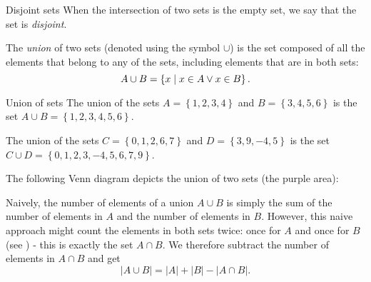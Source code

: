 \begin{note}{Disjoint sets}{}
	When the intersection of two sets is the empty set, we say that the set is \emph{disjoint}.
\end{note}

The \emph{union} of two sets (denoted using the symbol $\cup$) is the set composed of all the elements that belong to any of the sets, including elements that are in both sets:
\begin{equation}
	A\cup B = \left\{ x \mid x\in A \vee x\in B \right\}.
	\label{eq:union}
\end{equation}

\begin{example}{Union of sets}{}
	The union of the sets $A=\left\{ 1,2,3,4 \right\}$ and $B=\left\{ 3,4,5,6 \right\}$ is the set $A\cup B=\left\{ 1,2,3,4,5,6 \right\}$.

	The union of the sets $C=\left\{ 0,1,2,6,7 \right\}$ and $D=\left\{ 3,9,-4,5 \right\}$ is the set $C\cup D=\left\{ 0,1,2,3,-4,5,6,7,9 \right\}$.
\end{example}

The following Venn diagram depicts the union of two sets (the purple area):
\begin{figure}[H]
	\centering
\end{figure}

Naively, the number of elements of a union $A\cup B$ is simply the sum of the number of elements in $A$ and the number of elements in $B$. However, this naive approach might count the elements in both sets twice: once for $A$ and once for $B$ (see ) - this is exactly the set $A\cap B$. We therefore subtract the number of elements in $A\cap B$ and get
\begin{equation}
	|A\cup B| = |A|+|B|-|A\cap B|.
	\label{eq:number_of_elements_in_union}
\end{equation}

